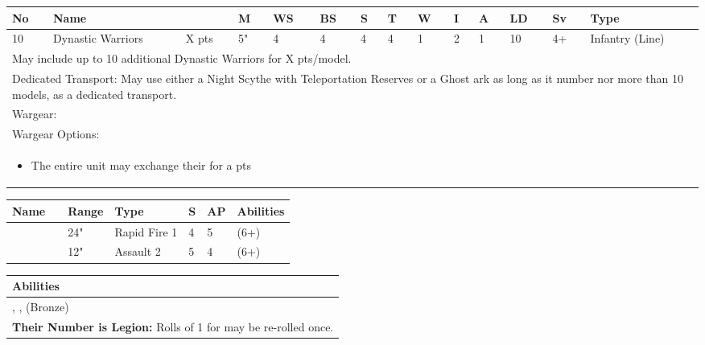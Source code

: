 

\noindent
\begin{tabular}{||m{10pt} m{95pt} m{30pt} m{11pt} m{11pt} m{11pt} m{11pt} m{11pt} m{11pt} m{11pt} m{11pt} m{11pt} m{11pt} m{125pt}||}
	\hline
	No & Name & & M & WS & BS & S & T & W & I & A & LD & Sv & Type \\
	\hline
	10 & Dynastic Warriors & X pts & 5" & 4 & 4 & 4 & 4 & 1 & 2 & 1 & 10 & 4+ & Infantry (Line)\\
	\hline
	\hline
	\multicolumn{14}{||Z{532 pt}||}{May include up to 10 additional Dynastic Warriors for X pts/model.}\\	
	\multicolumn{14}{||Z{532 pt}||}{Dedicated Transport: May use either a Night Scythe with Teleportation Reserves or a Ghost ark as long as it number nor more than 10 models, as a dedicated transport.}\\	
	\hline
	\hline
	\multicolumn{14}{||Z{532 pt}||}{Wargear: \quickref{Gauss Flayer}}\\
	\multicolumn{14}{||Z{532 pt}||}{Wargear Options:} \\	\multicolumn{14}{||Z{532 pt}||}{\begin{itemize}
			\item The entire unit may exchange their \quickref{Gauss Flayer} for a \quickref{Gauss Reaper} \hrulefill 0 pts
	\end{itemize}} \\
	\hline
\end{tabular}

\noindent
\begin{tabular}{||m{110pt} m{30pt} m{31pt} m{55pt} m{12pt} m{12pt} m{210pt}||}
	\hline
	Name & & Range & Type & S & AP & Abilities \\
	\hline
	\quickref{Gauss Flayer} & & 24" & Rapid Fire 1 & 4 & 5 & \quickref{Gauss} (6+) \\
	\quickref{Gauss Reaper} & & 12" & Assault 2 & 5 & 4 & \quickref{Gauss} (6+) \\
	\hline
\end{tabular}

\noindent
\begin{tabular}{||m{532pt}||}
	\hline
	Abilities \\
	\hline
	\quickref{Living Metal}, \quickref{Reanimation Protocols}, \quickref{Soulless Hordes} (Bronze) \\
	\textbf{Their Number is Legion:} Rolls of 1 for \quickref{Reanimation Protocols} may be re-rolled once. \\
	\hline
\end{tabular}


